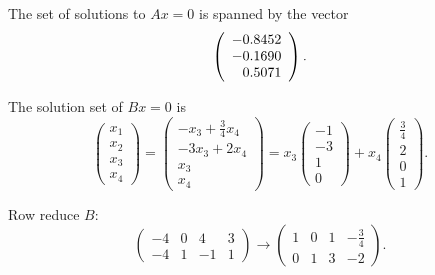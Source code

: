  The set of solutions to $Ax = 0$ is spanned by the vector
\[
\left(\begin{array}{r} -0.8452 \\ -0.1690 \\ 0.5071\end{array}\right).
\]

\ans The solution set of $Bx = 0$ is
\[
\left(\begin{array}{r} x_1 \\ x_2 \\ x_3 \\ x_4 \end{array}\right)
= \left(\begin{array}{c} -x_3 + \frac{3}{4}x_4 \\ -3x_3 + 2x_4 \\
x_3 \\ x_4 \end{array}\right) = x_3\left(\begin{array}{r} -1 \\ -3 \\
1 \\ 0 \end{array}\right) + x_4\left(\begin{array}{r} \frac{3}{4} \\
2 \\ 0 \\ 1 \end{array}\right).
\]

\soln Row reduce $B$:
\[
\left(\begin{array}{rrrr} -4 & 0 & 4 & 3 \\ -4 & 1 & -1 & 1
\end{array}\right) \longrightarrow \left(\begin{array}{rrrr}
1 & 0 & 1 & -\frac{3}{4} \\ 0 & 1 & 3 & -2 \end{array}\right).
\]

